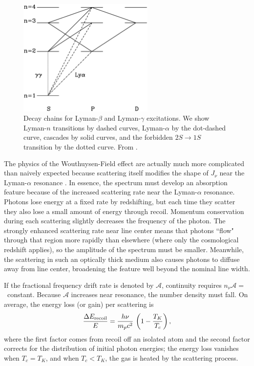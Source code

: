 \begin{figure}[]
\begin{center}
\includegraphics[width=0.6\textwidth]{Furlanetto/figure2-3}
\end{center}
\caption{Decay chains for Lyman-$\beta$ and Lyman-$\gamma$ excitations.  We show
  Lyman-$n$ transitions by dashed curves, Lyman-$\alpha$ by the dot-dashed
  curve, cascades by solid curves, and the forbidden $2S \rightarrow
  1S$ transition by the dotted curve. From \cite{pritchard06}.}
\label{fig:lygamma}
\end{figure}

The physics of the Wouthuysen-Field effect are actually much more complicated than naively expected because scattering itself modifies the shape of $J_\nu$ near the Lyman-$\alpha$ resonance \cite{chen04}. In essence, the spectrum must develop an absorption feature because of the increased scattering rate near the Lyman-$\alpha$ resonance. Photons lose energy at a fixed rate by redshifting, but each time they scatter they also lose a small amount of energy through recoil.  Momentum conservation during each scattering slightly decreases the frequency of the photon.  The strongly enhanced scattering rate near line center means that photons ``flow" through
that region more rapidly than elsewhere (where only the cosmological redshift applies), so the amplitude of the spectrum must be smaller.  Meanwhile, the scattering in such an optically thick medium also causes photons to diffuse away from line center, broadening the feature well beyond the nominal line width.

If the fractional frequency drift rate is denoted by ${\mathcal A}$, continuity requires $n_\nu {\mathcal A}=$~constant. Because ${\mathcal A}$ increases near resonance, the number density must fall.  On average, the energy loss (or gain) per scattering is \cite{chen04}
\begin{equation}
\frac{\Delta E_{\rm recoil}}{E} = \frac{h \nu}{m_p c^2} \, \left(1 - \frac{T_K}{T_c} \right),
\label{eq:recoil-loss}
\end{equation}
where the first factor comes from recoil off an isolated atom and the second factor corrects for the distribution of initial photon energies; the energy loss vanishes when $T_c = T_K$, and when $T_c < T_K$, the gas is heated by the scattering process.

